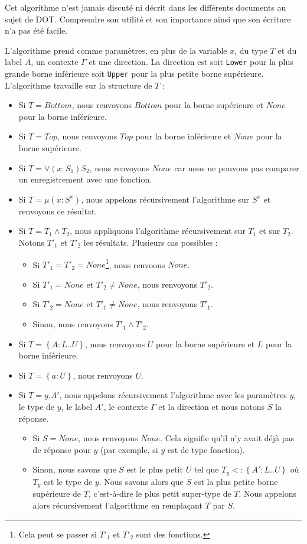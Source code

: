 Cet algorithme n'est jamais discuté ni décrit dans les différents
documents au sujet de DOT. Comprendre son utilité et son importance ainsi que
son écriture n'a pas été facile.

L'algorithme prend comme
paramètres, en plus de la variable $x$, du type $T$ et du label $A$, un contexte
$\Gamma$ et une direction. La direction est soit \verb|Lower| pour la
plus grande borne inférieure soit \verb|Upper| pour la plus petite borne
supérieure. L'algorithme travaille sur la structure de $T$ :

\begin{itemize}
\item Si $T = Bottom$, nous renvoyons $Bottom$ pour la borne supérieure et
  $None$ pour la borne inférieure.
\item Si $T = Top$, nous renvoyons $Top$ pour la borne inférieure et
  $None$ pour la borne supérieure.
\item Si $T = \forall(x : S_{1}) S_{2}$, nous renvoyons $None$ car nous
  ne pouvons pas comparer un enregistrement avec une fonction.
\item Si $T = \mu(x : S^{x})$, nous appelons récursivement l'algorithme sur
  $S^{x}$ et renvoyons ce résultat.
\item Si $T = T_{1} \wedge T_{2}$, nous
  appliquons l'algorithme récursivement sur $T_{1}$ et sur $T_{2}$. Notons
  $T'_{1}$ et $T'_{2}$ les résultats. Plusieurs cas possibles :
  \begin{itemize}
  \item Si $T'_{1} = T'_{2} = None$\footnote{Cela peut se
    passer si $T'_{1}$ et $T'_{2}$ sont des fonctions.}, nous renvoons $None$.
  \item Si $T'_{1} = None$ et $T'_{2} \neq None$, nous renvoyons $T'_{2}$.
  \item Si $T'_{2} = None$ et $T'_{1} \neq None$, nous renvoyons $T'_{1}$.
  \item Sinon, nous renvoyons $T'_{1} \wedge T'_{2}$.
  \end{itemize}
\item Si $T = \left\{ A : L .. U \right\}$, nous renvoyons $U$ pour la borne
  supérieure et $L$ pour la borne inférieure.
\item Si $T = \left\{ a : U \right\}$, nous renvoyons $U$.
\item Si $T = y.A'$, nous appelons récursivement l'algorithme avec les paramètres
  $y$, le type de $y$, le label $A'$, le contexte $\Gamma$ et la direction et
  nous notons $S$ la réponse.
  \begin{itemize}
  \item Si $S = None$, nous renvoyons $None$. Cela signifie qu'il n'y avait déjà
  pas de réponse pour $y$ (par exemple, si $y$ est de type fonction).
  \item Sinon, nous savons que $S$ est le plus petit $U$ tel que $T_{y} <:
    \left\{ A' 
    : L .. U \right\}$ où $T_{y}$ est le type de $y$. Nous savons alors que $S$
  est la plus petite borne supérieure de $T$, c'est-à-dire le plus petit super-type de $T$. Nous
  appelons alors récursivement l'algorithme en remplaçant $T$ par $S$.
  \end{itemize}
\end{itemize}

